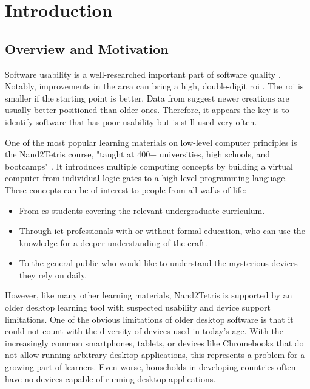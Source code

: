\chapter{Introduction}
\label{Introduction}

\section{Overview and Motivation}

Software usability is a well-researched important part of software quality \parencite{Almazroi2021}.
Notably, improvements in the area can bring a high, double-digit \gls{roi} \parencite{Nielsen_2008}.
The \gls{roi} is smaller if the starting point is better.
Data from \textcite{Nielsen_2008} suggest newer creations are usually better positioned than older ones.
Therefore, it appears the key is to identify software that has poor usability but is still used very often.

One of the most popular learning materials on low-level computer principles is the Nand2Tetris course, "taught at 400+ universities, high schools, and bootcamps" \parencite{nand2tetrisweb}.
It introduces multiple computing concepts by building a virtual computer from individual logic gates to a high-level programming language.
These concepts can be of interest to people from all walks of life:

\begin{itemize}
    \item From \gls{cs} students covering the relevant undergraduate curriculum.
    \item Through \gls{ict} professionals with or without formal education, who can use the knowledge for a deeper understanding of the craft.
    \item To the general public who would like to understand the mysterious devices they rely on daily.
\end{itemize}

However, like many other learning materials, Nand2Tetris is supported by an older desktop learning tool with suspected usability and device support limitations.
One of the obvious limitations of older desktop software is that it could not count with the diversity of devices used in today's age.
With the increasingly common smartphones, tablets, or devices like Chromebooks that do not allow running arbitrary desktop applications, this represents a problem for a growing part of learners.
Even worse, households in developing countries often have no devices capable of running desktop applications.

